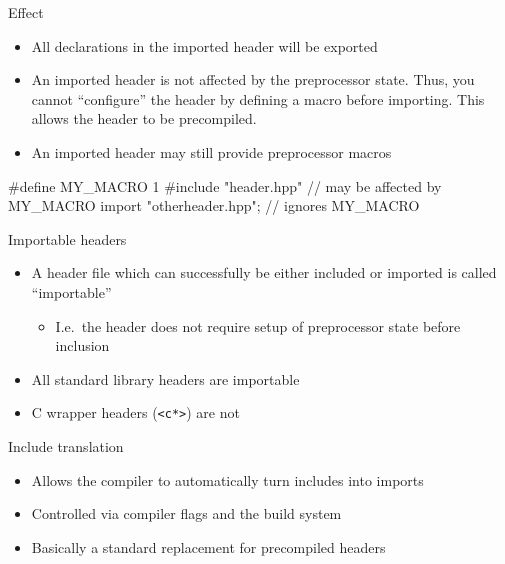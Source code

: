 \begin{frame}[fragile]
    \begin{block}{Effect}
      \begin{itemize}
      \item All declarations in the imported header will be exported
      \item An imported header is not affected by the preprocessor state.
            Thus, you cannot ``configure'' the header by defining a macro before importing.
            This allows the header to be precompiled.
      \item An imported header may still provide preprocessor macros
      \end{itemize}
    \end{block}
    \begin{cppcode}
      #define MY_MACRO 1
      #include "header.hpp" // may be affected by MY_MACRO
      import "otherheader.hpp"; // ignores MY_MACRO
    \end{cppcode}
\end{frame}

\begin{frame}[fragile]
    \begin{block}{Importable headers}
      \begin{itemize}
      \item A header file which can successfully be either included or imported is called ``importable''
      \begin{itemize}
        \item I.e.\ the header does not require setup of preprocessor state before inclusion
      \end{itemize}
      \item All standard library headers are importable
      \item C wrapper headers (\texttt{<c*>}) are not
      \end{itemize}
    \end{block}
    \begin{block}{Include translation}
      \begin{itemize}
        \item Allows the compiler to automatically turn includes into imports
        \item Controlled via compiler flags and the build system
        \item Basically a standard replacement for precompiled headers
      \end{itemize}
    \end{block}
\end{frame}


